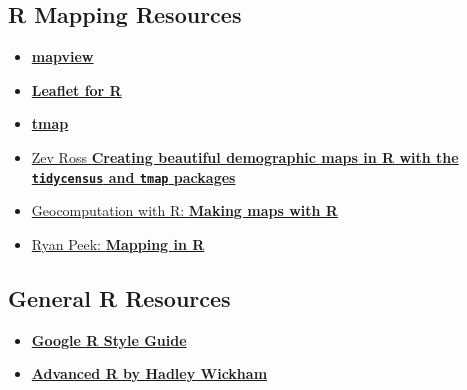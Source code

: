 \documentclass[
]{book}
\providecommand{\tightlist}{%
  \setlength{\itemsep}{0pt}\setlength{\parskip}{0pt}}
\begin{document}
\hypertarget{r-mapping-resources}{%
\subsection{R Mapping Resources}\label{r-mapping-resources}}

\begin{itemize}
\tightlist
\item
  \href{https://r-spatial.github.io/mapview/}{\textbf{mapview}}
\item
  \href{https://rstudio.github.io/leaflet/}{\textbf{Leaflet for R}}
\item
  \href{https://github.com/mtennekes/tmap}{\textbf{tmap}}
\item
  \href{http://zevross.com/blog/2018/10/02/creating-beautiful-demographic-maps-in-r-with-the-tidycensus-and-tmap-packages/}{Zev Ross \textbf{Creating beautiful demographic maps in R with the \texttt{tidycensus} and \texttt{tmap} packages}}
\item
  \href{https://geocompr.robinlovelace.net/adv-map.html}{Geocomputation with R: \textbf{Making maps with R}}
\item
  \href{https://ryanpeek.github.io/mapping-in-R-workshop/index.html}{Ryan Peek: \textbf{Mapping in R}}
\end{itemize}

\hypertarget{general-r-resources}{%
\subsection{General R Resources}\label{general-r-resources}}

\begin{itemize}
\tightlist
\item
  \href{https://google.github.io/styleguide/Rguide.xml}{\textbf{Google R Style Guide}}
\item
  \href{http://adv-r.had.co.nz/}{\textbf{Advanced R by Hadley Wickham}}
\end{itemize}
\end{document}

